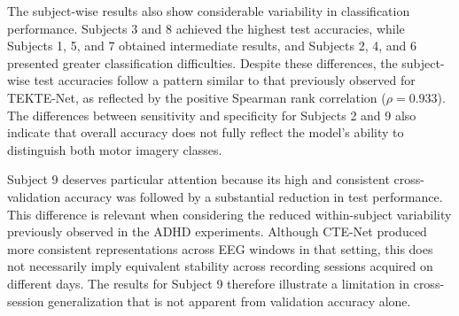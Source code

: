The subject-wise results also show considerable variability in classification performance. Subjects 3 and 8 achieved the highest test accuracies, while Subjects 1, 5, and 7 obtained intermediate results, and Subjects 2, 4, and 6 presented greater classification difficulties. Despite these differences, the subject-wise test accuracies follow a pattern similar to that previously observed for TEKTE-Net, as reflected by the positive Spearman rank correlation ($\rho = 0.933$). The differences between sensitivity and specificity for Subjects 2 and 9 also indicate that overall accuracy does not fully reflect the model's ability to distinguish both motor imagery classes.

Subject 9 deserves particular attention because its high and consistent cross-validation accuracy was followed by a substantial reduction in test performance. This difference is relevant when considering the reduced within-subject variability previously observed in the ADHD experiments. Although CTE-Net produced more consistent representations across EEG windows in that setting, this does not necessarily imply equivalent stability across recording sessions acquired on different days. The results for Subject 9 therefore illustrate a limitation in cross-session generalization that is not apparent from validation accuracy alone.

